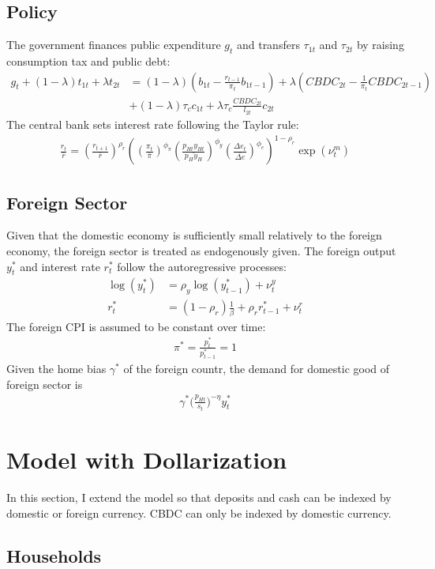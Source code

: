 \documentclass[12pt]{article}
\begin{document}
\subsection{Policy}
The government finances public expenditure $g_t$ and transfers $\tau_{1t}$ and $\tau_{2t}$ by raising consumption tax and public debt:
\begin{align*}
g_t + (1-\lambda)t_{1t}+\lambda t_{2t} &= (1-\lambda)(b_{1t}-\frac{r_{t-1}}{\pi_t}b_{1t-1})+\lambda(CBDC_{2t}-\frac{1}{\pi_t} CBDC_{2t-1} ) \\
& + (1-\lambda)\tau_c c_{1t} +\lambda\tau_c\frac{CBDC_{2t}}{l_{2t}}c_{2t}
\end{align*}
The central bank sets interest rate following the Taylor rule: 
\begin{align*}
\frac{r_t}{\bar{r}} = (\frac{r_{t+1}}{\bar{r}})^{\rho_r}((\frac{\pi_t}{\bar{\pi}} )^{\phi_{\pi}} (\frac{p_{Ht}y_{Ht}}{\bar{p_Hy_H}})^{\phi_y} (\frac{\Delta e_t}{\bar{\Delta e}})^{\phi_e})^{1-\rho_r}\exp(\nu_t^m)
\end{align*}

\subsection{Foreign Sector}
Given that the domestic economy is sufficiently small relatively to the foreign economy, the foreign sector is treated as endogenously given. The foreign output $y_t^*$ and interest rate $r_t^*$ follow the autoregressive processes: 
\begin{align*}
\log(y_t^*) &= \rho_y\log(y_{t-1}^*)+\nu_t^y \\
r_t^*&= (1-\rho_r)\frac{1}{\beta}+\rho_rr_{t-1}^*+\nu_t^r 
\end{align*}
The foreign CPI is assumed to be constant over time:
\begin{align*}
\pi^* = \frac{p_t^*}{p_{t-1}^*} = 1
\end{align*}
Given the home bias $\gamma^*$ of the foreign countr, the demand for domestic good of foreign sector is 
\begin{align*}
\gamma^*\Big(\frac{p_{Ht}}{s_t}\Big)^{-\eta}y_t^*
\end{align*}
\section{Model with Dollarization}
In this section, I extend the model so that deposits and cash can be indexed by domestic or foreign currency. CBDC can only be indexed by domestic currency. 
\subsection{Households}
\end{document}
